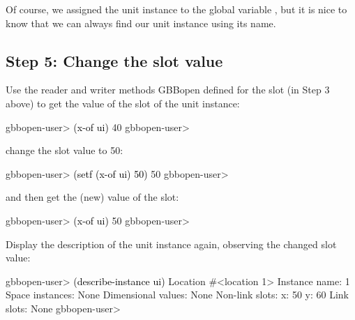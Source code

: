 \documentclass[10pt,twoside,english,pdftex]{article}
\begin{document}
Of course, we assigned the  unit instance to the global
variable , but it is nice to know that we can always find our unit
instance using its name.

\subsection*{Step 5: Change the  slot value}

%
%
%
%
%
%
%
%
Use the  reader and writer methods GBBopen defined for the
 slot (in Step 3 above) to get the value of the  slot of the
unit instance:
%
\W\supp
\begin{example}
\textcolor{darkergray}{%
  gbbopen-user> \textcolor{black}{(x-of ui)}
  40
  gbbopen-user>}
\end{example}
%
change the slot value to 50:
%
\W\supp\notpretop
\begin{example}
\textcolor{darkergray}{%
  gbbopen-user> \textcolor{black}{(setf (x-of ui) 50)}
  50
  gbbopen-user>}
\end{example}
%
and then get the (new) value of the  slot:
%
\W\supp\notpretop
\begin{example}
\textcolor{darkergray}{%
  gbbopen-user> \textcolor{black}{(x-of ui)}
  50
  gbbopen-user>}
\end{example}

%
Display the description of the  unit instance again,
observing the changed  slot value:
%
\begin{example}
\W\supp
\textcolor{darkergray}{%
  gbbopen-user> \textcolor{black}{(describe-instance ui)}
  Location #<location 1>
    Instance name: 1
    Space instances: None
    Dimensional values: None
    Non-link slots:
      x:  50
      y:  60
    Link slots: None
  gbbopen-user>}
\end{example}


\T\markright{}%
\T\pagestyle{plain}
\T\cleardoublepage
\W{}
\T\pagestyle{fancy}
\T\thispagestyle{fancybottom}
\T\renewcommand{\headrulewidth}{0pt}
\end{document}
